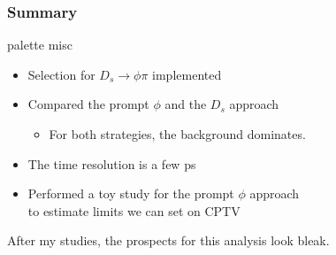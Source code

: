 \documentclass{beamer}
\newcommand{\beginbackup}{
   \newcounter{framenumbervorappendix}
   \setcounter{framenumbervorappendix}{\value{framenumber}}

}
\begin{document}
\begin{frame}[fragile]
\frametitle{Summary}

\begin{beamercolorbox}[rounded=true,shadow=true]{palette misc}

\begin{itemize}
\item Selection for $D_s \rightarrow \phi \pi$ implemented
\item Compared the prompt $\phi$ and the $D_s$ approach
\begin{itemize}
\item For both strategies, the background dominates.
\end{itemize}
\item The time resolution is a few ps
\item Performed a toy study for the prompt $\phi$ approach\\ to estimate limits we can set on CPTV
\end{itemize}
After my studies, the prospects for this analysis look bleak.
\end{beamercolorbox}
\end{frame}





\end{document}
